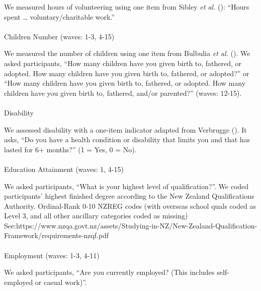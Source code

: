 \documentclass[
  single column]{article}
\makeatletter
\let\oldparagraph\paragraph
\renewcommand{\paragraph}{
    \@ifstar
      \xxxParagraphStar
      \xxxParagraphNoStar
  }
\newcommand{\xxxParagraphStar}[1]{\oldparagraph*{#1}\mbox{}}
\newcommand{\xxxParagraphNoStar}[1]{\oldparagraph{#1}\mbox{}}
\makeatother
\begin{document}
We measured hours of volunteering using one item from Sibley \emph{et
al.} (): ``Hours spent \ldots{}
voluntary/charitable work.''

\paragraph{Children Number (waves: 1-3,
4-15)}\label{children-number-waves-1-3-4-15}

We measured the number of children using one item from Bulbulia \emph{et
al.} (). We asked participants, ``How
many children have you given birth to, fathered, or adopted. How many
children have you given birth to, fathered, or adopted?'' or ``How many
children have you given birth to, fathered, or adopted. How many
children have you given birth to, fathered, and/or parented?'' (waves:
12-15).

\paragraph{Disability}\label{disability}

We assessed disability with a one-item indicator adapted from Verbrugge
(). It asks, ``Do you have a health
condition or disability that limits you and that has lasted for 6+
months?'' (1 = Yes, 0 = No).

\paragraph{Education Attainment (waves: 1,
4-15)}\label{education-attainment-waves-1-4-15}

We asked participants, ``What is your highest level of qualification?''.
We coded participants' highest finished degree according to the New
Zealand Qualifications Authority. Ordinal-Rank 0-10 NZREG codes (with
overseas school quals coded as Level 3, and all other ancillary
categories coded as missing)
See:https://www.nzqa.govt.nz/assets/Studying-in-NZ/New-Zealand-Qualification-Framework/requirements-nzqf.pdf

\paragraph{Employment (waves: 1-3,
4-11)}\label{employment-waves-1-3-4-11}

We asked participants, ``Are you currently employed? (This includes
self-employed or casual work)''.
\end{document}
